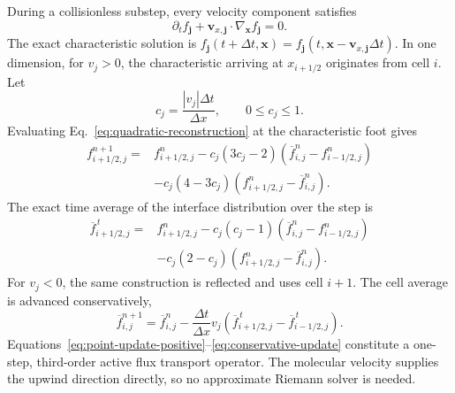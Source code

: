 \documentclass[preprint,3p,12pt]{elsarticle}
\newcommand{\vct}[1]{\boldsymbol{#1}}
\newcommand{\avg}[1]{\overline{#1}}
\begin{document}
During a collisionless substep, every velocity component satisfies
\begin{equation}
  \partial_t f_{\vct{j}}
  +\vct{v}_{x,\vct{j}}\cdot\nabla_{\vct{x}}f_{\vct{j}}=0.
  \label{eq:transport}
\end{equation}
The exact characteristic solution is $f_{\vct{j}}(t+\Delta t,\vct{x})=f_{\vct{j}}(t,\vct{x}-\vct{v}_{x,\vct{j}}\Delta t)$. In one dimension, for $v_j>0$, the characteristic arriving at $x_{i+1/2}$ originates from cell $i$. Let
\begin{equation}
  c_j = \frac{|v_j|\Delta t}{\Delta x},
  \qquad 0\le c_j\le 1.
  \label{eq:cfl}
\end{equation}
Evaluating Eq.~\eqref{eq:quadratic-reconstruction} at the characteristic foot gives
\begin{align}
  f_{i+1/2,j}^{n+1}
  ={}& f_{i+1/2,j}^{n}
  -c_j(3c_j-2)\left(\avg{f}_{i,j}^{n}-f_{i-1/2,j}^{n}\right) \nonumber\\
  &-c_j(4-3c_j)\left(f_{i+1/2,j}^{n}-\avg{f}_{i,j}^{n}\right).
  \label{eq:point-update-positive}
\end{align}
The exact time average of the interface distribution over the step is
\begin{align}
  \avg{f}_{i+1/2,j}^{\,t}
  ={}& f_{i+1/2,j}^{n}
  -c_j(c_j-1)\left(\avg{f}_{i,j}^{n}-f_{i-1/2,j}^{n}\right) \nonumber\\
  &-c_j(2-c_j)\left(f_{i+1/2,j}^{n}-\avg{f}_{i,j}^{n}\right).
  \label{eq:time-average-positive}
\end{align}
For $v_j<0$, the same construction is reflected and uses cell $i+1$. The cell average is advanced conservatively,
\begin{equation}
  \avg{f}_{i,j}^{n+1}
  = \avg{f}_{i,j}^{n}
  -\frac{\Delta t}{\Delta x}v_j
  \left(\avg{f}_{i+1/2,j}^{\,t}
       -\avg{f}_{i-1/2,j}^{\,t}\right).
  \label{eq:conservative-update}
\end{equation}
Equations~\eqref{eq:point-update-positive}--\eqref{eq:conservative-update} constitute a one-step, third-order active flux transport operator. The molecular velocity supplies the upwind direction directly, so no approximate Riemann solver is needed.
\end{document}
